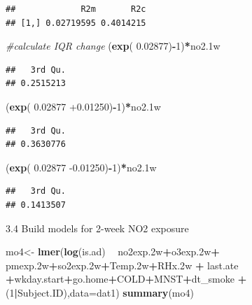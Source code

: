 \documentclass[12pt,]{article}
\newenvironment{Shaded}{\begin{snugshade}}{\end{snugshade}}
\newcommand{\CommentTok}[1]{\textcolor[rgb]{0.56,0.35,0.01}{\textit{#1}}}
\newcommand{\DataTypeTok}[1]{\textcolor[rgb]{0.13,0.29,0.53}{#1}}
\newcommand{\DecValTok}[1]{\textcolor[rgb]{0.00,0.00,0.81}{#1}}
\newcommand{\FloatTok}[1]{\textcolor[rgb]{0.00,0.00,0.81}{#1}}
\newcommand{\KeywordTok}[1]{\textcolor[rgb]{0.13,0.29,0.53}{\textbf{#1}}}
\newcommand{\NormalTok}[1]{#1}
\newcommand{\OperatorTok}[1]{\textcolor[rgb]{0.81,0.36,0.00}{\textbf{#1}}}
\newcommand{\StringTok}[1]{\textcolor[rgb]{0.31,0.60,0.02}{#1}}
\begin{document}
\begin{verbatim}
##             R2m       R2c
## [1,] 0.02719595 0.4014215
\end{verbatim}

\begin{Shaded}
\begin{Highlighting}[]
\CommentTok{#calculate IQR change}
\NormalTok{(}\KeywordTok{exp}\NormalTok{( }\FloatTok{0.02877}\NormalTok{)}\OperatorTok{-}\DecValTok{1}\NormalTok{)}\OperatorTok{*}\NormalTok{no2}\FloatTok{.1}\NormalTok{w}
\end{Highlighting}
\end{Shaded}

\begin{verbatim}
##   3rd Qu. 
## 0.2515213
\end{verbatim}

\begin{Shaded}
\begin{Highlighting}[]
\NormalTok{(}\KeywordTok{exp}\NormalTok{( }\FloatTok{0.02877} \FloatTok{+0.01250}\NormalTok{)}\OperatorTok{-}\DecValTok{1}\NormalTok{)}\OperatorTok{*}\NormalTok{no2}\FloatTok{.1}\NormalTok{w}
\end{Highlighting}
\end{Shaded}

\begin{verbatim}
##   3rd Qu. 
## 0.3630776
\end{verbatim}

\begin{Shaded}
\begin{Highlighting}[]
\NormalTok{(}\KeywordTok{exp}\NormalTok{( }\FloatTok{0.02877} \FloatTok{-0.01250}\NormalTok{)}\OperatorTok{-}\DecValTok{1}\NormalTok{)}\OperatorTok{*}\NormalTok{no2}\FloatTok{.1}\NormalTok{w}
\end{Highlighting}
\end{Shaded}

\begin{verbatim}
##   3rd Qu. 
## 0.1413507
\end{verbatim}

3.4 Build models for 2-week NO2 exposure

\begin{Shaded}
\begin{Highlighting}[]
\NormalTok{mo4<-}\StringTok{ }\KeywordTok{lmer}\NormalTok{(}\KeywordTok{log}\NormalTok{(is.ad) }\OperatorTok{~}\StringTok{ }\NormalTok{no2exp}\FloatTok{.2}\NormalTok{w}\OperatorTok{+}\NormalTok{o3exp}\FloatTok{.2}\NormalTok{w}\OperatorTok{+}\StringTok{ }\NormalTok{pmexp}\FloatTok{.2}\NormalTok{w}\OperatorTok{+}\NormalTok{so2exp}\FloatTok{.2}\NormalTok{w}\OperatorTok{+}\NormalTok{Temp}\FloatTok{.2}\NormalTok{w}\OperatorTok{+}\NormalTok{RHx}\FloatTok{.2}\NormalTok{w }\OperatorTok{+}\StringTok{ }\NormalTok{last.ate }\OperatorTok{+}\NormalTok{wkday.start}\OperatorTok{+}\NormalTok{go.home}\OperatorTok{+}\NormalTok{COLD}\OperatorTok{+}\NormalTok{MNST}\OperatorTok{+}\NormalTok{dt_smoke }\OperatorTok{+}\NormalTok{(}\DecValTok{1}\OperatorTok{|}\NormalTok{Subject.ID),}\DataTypeTok{data=}\NormalTok{dat1)}
\KeywordTok{summary}\NormalTok{(mo4)}
\end{Highlighting}
\end{Shaded}
\end{document}
